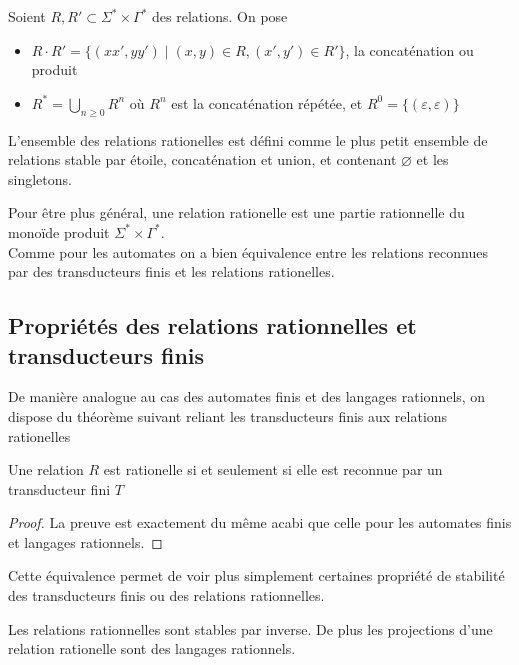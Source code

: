 \documentclass{scrartcl}
\begin{document}
\begin{flushleft}
\begin{define}
    Soient $R, R' \subset \Sigma^* \times \Gamma^*$ des relations. On pose
    \begin{itemize}
        \item $R \cdot R' = \{ (xx', yy') \mid (x, y) \in R, (x', y') \in R' \}$, la concaténation ou produit
        \item $\displaystyle R^* = \bigcup_{n \geq 0} R^n$ où $R^n$ est la concaténation répétée, et $R^0 =
        \{ (\varepsilon, \varepsilon) \}$
    \end{itemize}
\end{define}

\begin{define}
    L'ensemble des relations rationelles est défini comme le plus petit ensemble de relations stable par étoile,
    concaténation et union, et contenant $\varnothing$ et les singletons.
\end{define}

Pour être plus général, une relation rationelle est une partie rationnelle du monoïde produit
$\Sigma^* \times \Gamma^*$.\\
Comme pour les automates on a bien équivalence entre les relations reconnues par des transducteurs finis
et les relations rationelles.

\subsection{Propriétés des relations rationnelles et transducteurs finis}

De manière analogue au cas des automates finis et des langages rationnels, on dispose du théorème suivant reliant
les transducteurs finis aux relations rationelles

\begin{theorem}
    Une relation $R$ est rationelle si et seulement si elle est reconnue par un transducteur fini $T$
\end{theorem}

\begin{proof}
    La preuve est exactement du même acabi que celle pour les automates finis et langages rationnels.
\end{proof}

Cette équivalence permet de voir plus simplement certaines propriété de stabilité des transducteurs finis ou des relations
rationnelles.
\begin{prop} \label{stabRat}
    Les relations rationnelles sont stables par inverse. De plus les projections d'une relation
    rationelle sont des langages rationnels.
\end{prop}


\end{flushleft}
\end{document}
